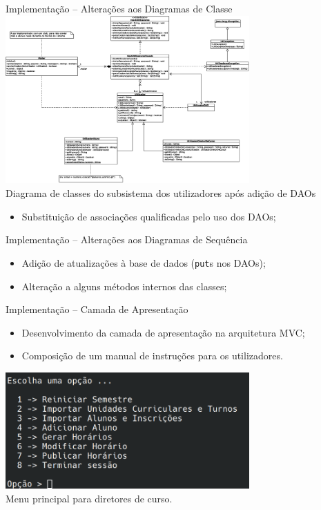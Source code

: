 \documentclass[13pt, handout]{beamer}
\begin{document}
\begin{frame}{Implementação -- Alterações aos Diagramas de Classe}
    \centering
    \includegraphics[width=0.7\textwidth]{Imagens/Modelos/UtilizadoresDAO.svg.eps} \\
    {\scriptsize Diagrama de classes do subsistema dos utilizadores após adição de DAOs}

    \vspace{0.5cm}
    \begin{itemize}
        \item Substituição de associações qualificadas pelo uso dos DAOs;
    \end{itemize}
\end{frame}

\begin{frame}{Implementação -- Alterações aos Diagramas de Sequência}
    \begin{itemize}
        \item Adição de atualizações à base de dados (\texttt{put}s nos DAOs);
        \item Alteração a alguns métodos internos das classes;
    \end{itemize}
\end{frame}

\begin{frame}{Implementação -- Camada de Apresentação}
    \centering

    \begin{itemize}
        \item Desenvolvimento da camada de apresentação na arquitetura MVC;
        \item Composição de um manual de instruções para os utilizadores.
    \end{itemize}
    \vspace{0.5cm}

    \includegraphics[width=0.7\textwidth]{Imagens/Manual/DiretorCurso.png} \\
    {\scriptsize Menu principal para diretores de curso.}
\end{frame}
\end{document}

